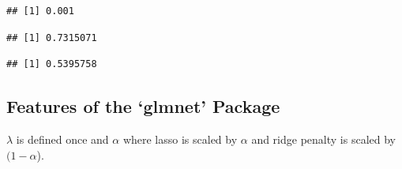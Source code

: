 \documentclass[
]{book}
\newenvironment{Shaded}{\begin{snugshade}}{\end{snugshade}}
\newcommand{\AttributeTok}[1]{\textcolor[rgb]{0.77,0.63,0.00}{#1}}
\newcommand{\CommentTok}[1]{\textcolor[rgb]{0.56,0.35,0.01}{\textit{#1}}}
\newcommand{\FloatTok}[1]{\textcolor[rgb]{0.00,0.00,0.81}{#1}}
\newcommand{\FunctionTok}[1]{\textcolor[rgb]{0.00,0.00,0.00}{#1}}
\newcommand{\NormalTok}[1]{#1}
\newcommand{\OtherTok}[1]{\textcolor[rgb]{0.56,0.35,0.01}{#1}}
\newcommand{\SpecialCharTok}[1]{\textcolor[rgb]{0.00,0.00,0.00}{#1}}
\begin{document}
\begin{Shaded}
\end{Shaded}

\begin{verbatim}
## [1] 0.001
\end{verbatim}

\begin{Shaded}
\end{Shaded}

\begin{verbatim}
## [1] 0.7315071
\end{verbatim}

\begin{Shaded}
\end{Shaded}

\begin{verbatim}
## [1] 0.5395758
\end{verbatim}

\hypertarget{features-of-the-glmnet-package}{%
\subsection{Features of the `glmnet' Package}\label{features-of-the-glmnet-package}}

\(\lambda\) is defined once and \(\alpha\) where lasso is scaled by \(\alpha\) and ridge penalty is scaled by \((1-\alpha\)).
\end{document}
